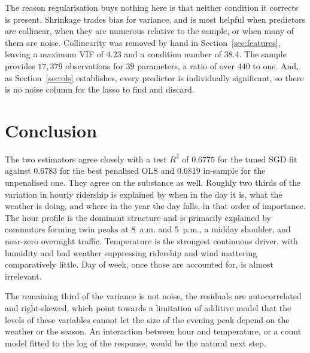 \documentclass[11pt]{article}
\begin{document}
The reason regularisation buys nothing here is that neither condition
it corrects is present. Shrinkage trades bias for variance, and is
most helpful when predictors are collinear, when
they are numerous relative to the sample, or when many of them are
noise. Collinearity was removed by hand in
Section~\ref{sec:features}, leaving a maximum
VIF of $4.23$ and a condition number of $38.4$. The sample provides
$17{,}379$ observations for $39$ parameters, a ratio of over $440$ to
one. And, as Section~\ref{sec:ols} establishes, every predictor is individually
significant, so there is no noise column for the lasso to find and
discard.

\section{Conclusion}
\label{sec:conclusion}

The two estimators agree closely with a test $R^2$ of $0.6775$ for the
tuned SGD fit against $0.6783$ for the best penalised OLS and $0.6819$
in-sample for the unpenalised one. They agree on the substance
as well. Roughly two thirds of the variation in hourly ridership is
explained by when in the day it is, what the weather is doing, and
where in the year the day falls, in that order of importance. The hour
profile is the dominant structure and is primarily explained by
commutors forming twin peaks at 8~a.m. and 5~p.m., a midday shoulder,
and near-zero overnight traffic. Temperature is the strongest
continuous driver, with humidity and bad weather suppressing
ridership and wind mattering comparatively little. Day of week, once
those are accounted for, is almost irrelevant.

The remaining third of the variance is not noise, the residuals are
autocorrelated and right-skewed, which point towards a limitation of
additive model that the levels of these variables cannot
let the size of the evening peak depend on the
weather or the season. An interaction between hour and temperature, or
a count model fitted to the log of the response, would be the natural
next step.
\end{document}
